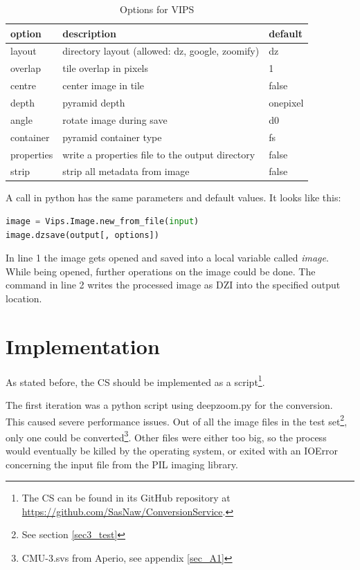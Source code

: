 \begin{table}[H]
	\begin{center}
		\begin{tabular}{| l | l | l |}
			\hline
			\textbf{option} & \textbf{description} & \textbf{default} \\ \hline
			layout & directory layout (allowed: dz, google, zoomify) & dz \\ \hline
			overlap & tile overlap in pixels & 1 \\ \hline
			centre & center image in tile & false \\ \hline
			depth & pyramid depth & onepixel \\ \hline
			angle & rotate image during save & d0 \\ \hline
			container & pyramid container type & fs \\ \hline
			properties & write a properties file to the output directory & false \\ \hline
			strip & strip all metadata from image & false \\ \hline
		\end{tabular}
		\caption{Options for VIPS}
		\label{tab3_optionsVips}
	\end{center}
\end{table}

A call in python has the same parameters and default values. It looks like this:

\begin{lstlisting}[frame=single, language=python]
image = Vips.Image.new_from_file(input)
image.dzsave(output[, options])
\end{lstlisting}

In line 1 the image gets opened and saved into a local variable called \emph{image}. While being opened, further operations on the image could be done. The command in line 2 writes the processed image as DZI into the specified output location.


\section{Implementation}

As stated before, the CS should be implemented as a script\footnote{
	The CS can be found in its GitHub repository at \url{https://github.com/SasNaw/ConversionService}.
}.

The first iteration was a python script using deepzoom.py for the conversion. This caused severe performance issues. Out of all the image files in the test set\footnote{See section \ref{sec3_test}}, only one could be converted\footnote{CMU-3.svs from Aperio, see appendix \ref{sec_A1}}. Other files were either too big, so the process would eventually be killed by the operating system, or exited with an IOError concerning the input file from the PIL imaging library.

